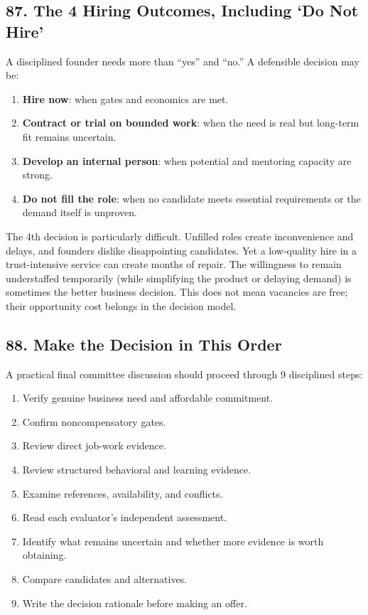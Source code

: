 \subsection*{87. The 4 Hiring Outcomes, Including `Do Not Hire'}

A disciplined founder needs more than ``yes'' and ``no.'' A defensible decision may be:
\begin{enumerate}[leftmargin=*]
\item \textbf{Hire now}: when gates and economics are met.
\item \textbf{Contract or trial on bounded work}: when the need is real but long-term fit remains uncertain.
\item \textbf{Develop an internal person}: when potential and mentoring capacity are strong.
\item \textbf{Do not fill the role}: when no candidate meets essential requirements or the demand itself is unproven.
\end{enumerate}

The 4th decision is particularly difficult. Unfilled roles create inconvenience and delays, and founders dislike disappointing candidates. Yet a low-quality hire in a trust-intensive service can create months of repair. The willingness to remain understaffed temporarily (while simplifying the product or delaying demand) is sometimes the better business decision. This does not mean vacancies are free; their opportunity cost belongs in the decision model.

\subsection*{88. Make the Decision in This Order}

A practical final committee discussion should proceed through 9 disciplined steps:
\begin{enumerate}[leftmargin=*]
\item Verify genuine business need and affordable commitment.
\item Confirm noncompensatory gates.
\item Review direct job-work evidence.
\item Review structured behavioral and learning evidence.
\item Examine references, availability, and conflicts.
\item Read each evaluator's independent assessment.
\item Identify what remains uncertain and whether more evidence is worth obtaining.
\item Compare candidates and alternatives.
\item Write the decision rationale before making an offer.
\end{enumerate}


